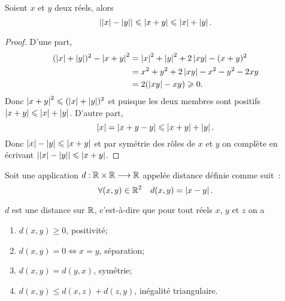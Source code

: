   \begin{prop}
    Soient \(x\) et \(y\) deux réels, alors
    \begin{equation}
      \left\lvert\left\lvert x\right\rvert - \left\lvert y\right\rvert\right\rvert \leqslant \left\lvert x + y\right\rvert \leqslant \left\lvert x\right\rvert + \left\lvert y\right\rvert.
    \end{equation}
  \end{prop}
  \begin{proof}
    D'une part,
    \begin{align}
      (\left\lvert x\right\rvert + \left\lvert y\right\rvert)^2 - \left\lvert x + y\right\rvert^2 & = \left\lvert x\right\rvert^2 + \left\lvert y\right\rvert^2 + 
      2\left\lvert xy\right\rvert - (x + y)^2\\
                                            & = x^2 + y^2 + 2\left\lvert xy\right\rvert - x^2 - 
                                            y^2 - 2xy\\
                                            & = 2(\left\lvert xy\right\rvert - xy)\geqslant 0.
    \end{align}
    Donc \(\left\lvert x + y\right\rvert^2\leqslant (\left\lvert x\right\rvert + \left\lvert y\right\rvert)^2\) et puisque les deux 
    membres sont positifs \(\left\lvert x + y\right\rvert\leqslant \left\lvert x\right\rvert + \left\lvert y\right\rvert\). D'autre 
    part,
    \begin{equation}
      \left\lvert x\right\rvert = \left\lvert x + y - y\right\rvert\leqslant \left\lvert x + y\right\rvert + \left\lvert y\right\rvert.
    \end{equation}
    Donc \(\left\lvert x\right\rvert - \left\lvert y\right\rvert\leqslant \left\lvert x + y\right\rvert\) et par symétrie des rôles de 
    \(x\) et \(y\) on complète en écrivant \(\left\lvert\left\lvert x\right\rvert - \left\lvert y\right\rvert\right\rvert\leqslant 
    \left\lvert x + y\right\rvert\).
  \end{proof}
  \begin{defdef}
    Soit une application \(d:\mathbb{R}\times\mathbb{R} \longrightarrow{} \mathbb{R}\) appelée distance définie 
    comme suit~:
    \begin{equation}
      \forall (x, y) \in \mathbb{R}^2 \quad d(x, y) = \left\lvert x - y\right\rvert.
    \end{equation}
  \end{defdef}
  \begin{prop}
    \(d\) est une distance sur \(\mathbb{R}\), c'est-à-dire que pour tout réels \(x\), 
    \(y\) et \(z\) on a
    \begin{enumerate}
      \item \(d(x, y) \geqslant 0\), positivité;
      \item \(d(x, y) = 0 \iff x = y\), séparation;
      \item \(d(x, y) = d(y, x)\), symétrie;
      \item \(d(x, y) \leqslant d(x, z) + d(z, y)\), inégalité triangulaire.
    \end{enumerate}
  \end{prop}
